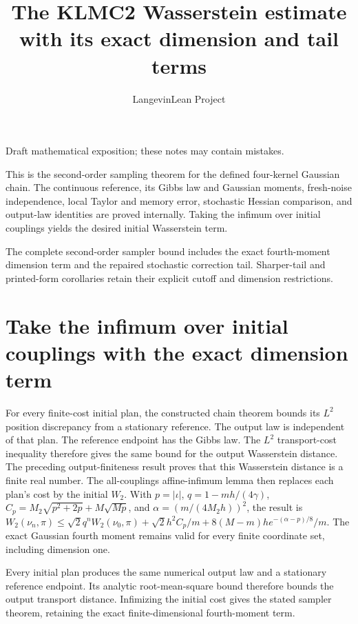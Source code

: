 \documentclass[11pt,a4paper]{article}
\title{\texorpdfstring{The KLMC2 Wasserstein estimate with its exact dimension and tail terms}{The KLMC2 Wasserstein estimate with its exact dimension and tail terms}}
\author{LangevinLean Project}
\date{}
\begin{document}
\maketitle
Draft mathematical exposition; these notes may contain mistakes.


This is the second-order sampling theorem for the defined four-kernel Gaussian chain. The continuous reference, its Gibbs law and Gaussian moments, fresh-noise independence, local Taylor and memory error, stochastic Hessian comparison, and output-law identities are proved internally. Taking the infimum over initial couplings yields the desired initial Wasserstein term.



The complete second-order sampler bound includes the exact fourth-moment dimension term and the repaired stochastic correction tail. Sharper-tail and printed-form corollaries retain their explicit cutoff and dimension restrictions.


\section{\texorpdfstring{Take the infimum over initial couplings with the exact dimension term}{Take the infimum over initial couplings with the exact dimension term}}


For every finite-cost initial plan, the constructed chain theorem bounds its \(L^{2}\) position discrepancy from a stationary reference. The output law is independent of that plan. The reference endpoint has the Gibbs law. The \(L^{2}\) transport-cost inequality therefore gives the same bound for the output Wasserstein distance. The preceding output-finiteness result proves that this Wasserstein distance is a finite real number. The all-couplings affine-infimum lemma then replaces each plan’s cost by the initial \(W_2\). With \(p=|\iota|\), \(q=1-mh/(4\gamma)\), \(C_p=M_2\sqrt{p^2+2p}+M\sqrt{Mp}\), and \(\alpha=(m/(4M_2h))^2\), the result is \(W_2(\nu_n,\pi)\le\sqrt2q^nW_2(\nu_0,\pi)+\sqrt2h^2C_p/m+8(M-m)h e^{-(\alpha-p)/8}/m\). The exact Gaussian fourth moment remains valid for every finite coordinate set, including dimension one.



Every initial plan produces the same numerical output law and a stationary reference endpoint. Its analytic root-mean-square bound therefore bounds the output transport distance. Infimizing the initial cost gives the stated sampler theorem, retaining the exact finite-dimensional fourth-moment term.
\end{document}
